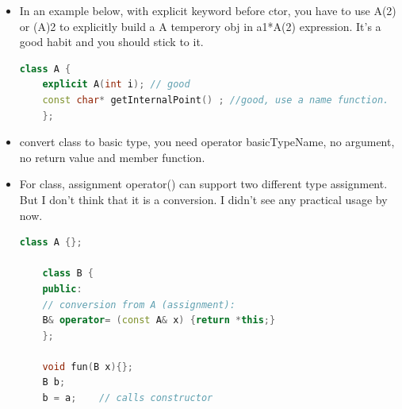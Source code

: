 \documentclass[a4paper,11pt,twoside]{book}
\begin{document}
\begin{itemize}
	\item In an example below, with explicit keyword before ctor,  you have to use A(2) or (A)2 to explicitly build a A temperory obj in a1*A(2) expression. It's a good habit and you should stick to it. 
	\begin{lstlisting}[frame=single, language=c++]
	class A {
	explicit A(int i); // good
	const char* getInternalPoint() ; //good, use a name function.
	};
	\end{lstlisting}
	
	\item  convert class to basic type, you need operator basicTypeName, no argument, no return value and member function.
	
	
	\item For class, assignment operator() can support two different type assignment. But I don't think that it is a conversion. I didn't see any practical usage by now. 
	\begin{lstlisting}[frame=single, language=c++]
	class A {};
	
	class B {
	public:
	// conversion from A (assignment):
	B& operator= (const A& x) {return *this;}
	};
	
	void fun(B x){};
	B b;
	b = a;    // calls constructor
	\end{lstlisting}
	
\end{itemize}
\end{document}
